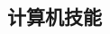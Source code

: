 \documentclass[10pt]{article} %
\begin{document}
\begin{paracol}{2}
	
	
	
	\medskip %
	
	
	
	\section{计算机技能} 
	

\end{paracol}
\end{document}
